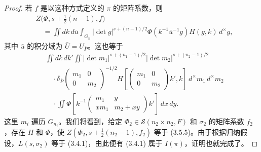 \begin{proof}
若 $f$ 是以这种方式定义的 $\pi$ 的矩阵系数，则
\begin{equation}
\begin{aligned}
&Z\bigl(\Phi,s+\tfrac12(n-1),f\bigr)\\
&\quad=\iint dk\,d\bar u\int_{G_n}|\det g|^{s+(n-1)/2}
\Phi(k^{-1}\bar u^{-1}g)H(g,k)\,d^\times g,
\end{aligned}\tag{3.5.4}
\end{equation}
其中 $\bar u$ 的积分域为 $\bar U=U_{\bar P}$。这也等于
\begin{equation}
\begin{aligned}
&\iint dk\,dk'\iint
|\det m_1|^{s+(n_1-1)/2}|\det m_2|^{s+(n_2-1)/2}\\
&\quad\cdot\delta_{\bar P}\!\begin{pmatrix}m_1&0\\0&m_2\end{pmatrix}^{-1/2}
H\!\left[\begin{pmatrix}m_1&0\\0&m_2\end{pmatrix}k',k\right]
\,d^\times m_1\,d^\times m_2\\
&\quad\cdot\iint\Phi\!\left[k^{-1}\begin{pmatrix}m_1&y\\xm_1&m_2+xy\end{pmatrix}k'\right]\,dx\,dy.
\end{aligned}\tag{3.5.5}
\end{equation}
这里 $m_i$ 遍历 $G_{n_i}$。我们将看到，给定 $\Phi_2\in\mathcal S(n_2\times n_2,F)$ 和 $\sigma_2$ 的矩阵系数 $f_2$，存在 $H$ 和 $\Phi$，使 $Z(\Phi_2,s+\tfrac12(n_2-1),f_2)$ 等于 (3.5.5)。由于根据归纳假设，$L(s,\sigma_2)$ 等于 (3.4.1)，由此便有 (3.4.1) 属于 $I(\pi)$，证明也就完成了。


\end{proof}
